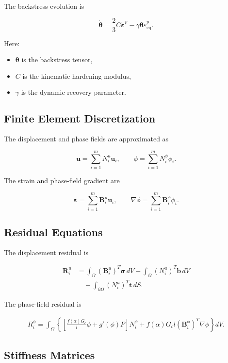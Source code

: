 ﻿\documentclass[11pt,a4paper]{article}
\begin{document}
The backstress evolution is

\[
\dot{\bm{\theta}}
=
\frac{2}{3}C\dot{\bm{\varepsilon}}^p
-
\gamma \bm{\theta}\dot{\varepsilon}_{\mathrm{eq}}^p.
\]

Here:

\begin{itemize}[leftmargin=*]
    \item $\bm{\theta}$ is the backstress tensor,
    \item $C$ is the kinematic hardening modulus,
    \item $\gamma$ is the dynamic recovery parameter.
\end{itemize}

\subsection{Finite Element Discretization}

The displacement and phase fields are approximated as

\[
\bm{u}
=
\sum_{i=1}^{m}
N_i^u \bm{u}_i,
\qquad
\phi
=
\sum_{i=1}^{m}
N_i^\phi \phi_i.
\]

The strain and phase-field gradient are

\[
\bm{\varepsilon}
=
\sum_{i=1}^{m}
\bm{B}_i^u\bm{u}_i,
\qquad
\nabla \phi
=
\sum_{i=1}^{m}
\bm{B}_i^\phi \phi_i.
\]

\subsection{Residual Equations}

The displacement residual is

\[
\begin{aligned}
\bm{R}_i^u
&=
\int_{\Omega}
(\bm{B}_i^u)^T\bm{\sigma}\,dV
-
\int_{\Omega}
(N_i^u)^T\bm{b}\,dV \\
&\quad
-
\int_{\partial\Omega}
(N_i^u)^T\bm{t}\,dS.
\end{aligned}
\]

The phase-field residual is

\[
\begin{aligned}
R_i^\phi
=
\int_{\Omega}
\left\{
\left[
\frac{f(\alpha)G_c}{l}\phi
+
g'(\phi)P
\right]
N_i^\phi
+
f(\alpha)G_c l
(\bm{B}_i^\phi)^T\nabla\phi
\right\}dV.
\end{aligned}
\]

\subsection{Stiffness Matrices}
\end{document}
